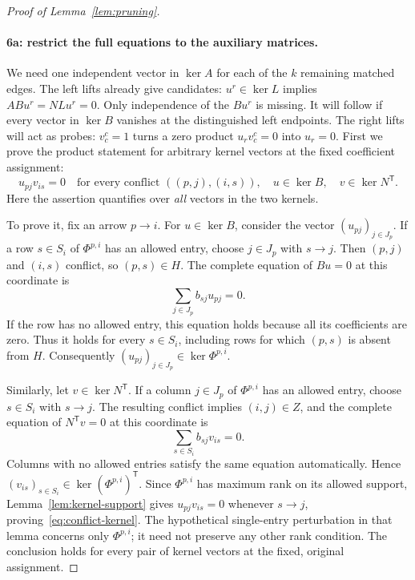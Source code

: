 \begin{proof}[Proof of Lemma~\ref{lem:pruning}]
\paragraph{6a: restrict the full equations to the auxiliary matrices.}
We need one independent vector in $\ker A$ for each of the $k$ remaining
matched edges. The left lifts already give candidates: $u^r\in\ker L$
implies $ABu^r=NLu^r=0$. Only independence of the $Bu^r$ is missing.
It will follow if every vector in $\ker B$ vanishes at the distinguished
left endpoints. The right lifts will act as probes: $v^c_c=1$ turns a
zero product $u_rv^c_c=0$ into $u_r=0$.
First we prove the product statement for arbitrary kernel vectors at the
fixed coefficient assignment:
\begin{equation}\label{eq:conflict-kernel}
 u_{pj}v_{is}=0
 \quad\text{for every conflict }((p,j),(i,s)),
 \quad u\in\ker B,\quad v\in\ker N^{\mathsf T}.
\end{equation}
Here the assertion quantifies over \emph{all} vectors in the two kernels.

To prove it, fix an arrow $p\to i$.  For $u\in\ker B$, consider the
vector $(u_{pj})_{j\in J_p}$.  If a row $s\in S_i$ of $\Phi^{p,i}$ has
an allowed entry, choose $j\in J_p$ with $s\to j$.  Then
$(p,j)$ and $(i,s)$ conflict, so $(p,s)\in H$.  The complete equation
of $Bu=0$ at this coordinate is
\begin{equation}\label{eq:pruning-row-equation}
 \sum_{j\in J_p}b_{sj}u_{pj}=0.
\end{equation}
If the row has no allowed entry, this equation holds because all its
coefficients are zero.  Thus it holds for every $s\in S_i$, including
rows for which $(p,s)$ is absent from $H$.  Consequently
$(u_{pj})_{j\in J_p}\in\ker \Phi^{p,i}$.

Similarly, let $v\in\ker N^{\mathsf T}$.  If a column $j\in J_p$
of $\Phi^{p,i}$ has an allowed entry, choose $s\in S_i$ with $s\to j$.
The resulting conflict implies $(i,j)\in Z$, and the complete equation
of $N^{\mathsf T}v=0$ at this coordinate is
\begin{equation}\label{eq:pruning-column-equation}
 \sum_{s\in S_i}b_{sj}v_{is}=0.
\end{equation}
Columns with no allowed entries satisfy the same equation
automatically.  Hence $(v_{is})_{s\in S_i}\in\ker(\Phi^{p,i})^{\mathsf T}$.
Since $\Phi^{p,i}$ has maximum rank on its allowed support,
Lemma~\ref{lem:kernel-support} gives $u_{pj}v_{is}=0$ whenever
$s\to j$, proving~\eqref{eq:conflict-kernel}.
The hypothetical single-entry perturbation in that lemma concerns only
$\Phi^{p,i}$; it need not preserve any other rank condition.  The conclusion
holds for every pair of kernel vectors at the fixed, original assignment.


\end{proof}
